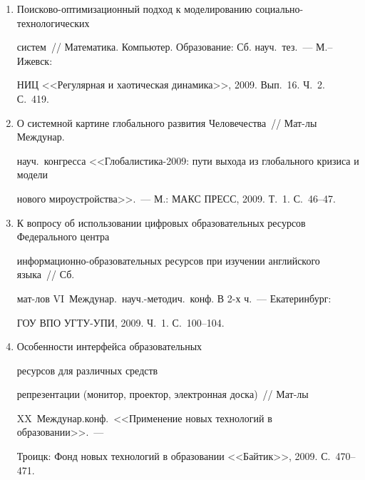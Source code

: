\begin{enumerate}[1.]
<<Информационные системы и технологии (ИСТ-2009)>>.~--- Нижний Новгород: НГТУ, 2009. С.~13--15.





\item {}


Поисково-оптимизационный подход к моделированию социально-технологических 


систем~// Математика. Компьютер. Образование: Сб. науч.\ тез.~--- М.--Ижевск: 


НИЦ <<Регулярная и хаотическая динамика>>, 2009. Вып.~16. Ч.~2. С.~419.





\item {}


О системной картине глобального развития Человечества~// Мат-лы Междунар.\


науч.\ конгресса <<Гло\-ба\-ли\-сти\-ка-2009: пути выхода из глобального кризиса и модели 


нового мироустройства>>.~--- М.: МАКС ПРЕСС, 2009. Т.~1.  С.~46--47.





\item {}


К вопросу об использовании цифровых образовательных ресурсов Федерального центра 


информационно-образовательных ресурсов при изучении английского языка~// Сб. 


мат-лов VI~Междунар.\ науч.-ме\-то\-дич.\ конф. В 2-х ч.~--- Екатеринбург: 


ГОУ ВПО УГТУ-УПИ, 2009. Ч.~1. С.~100--104.





\item {}


Особенности интерфейса образовательных\linebreak


ресурсов для различных средств 


репрезентации (монитор, проектор, электронная доска)~// Мат-лы 


XX~Междунар.\linebreak конф.\ <<Применение новых технологий в образовании>>.~--- 


Троицк: Фонд новых технологий в образовании  <<Байтик>>, 2009. С.~470--471.






\end{enumerate}
